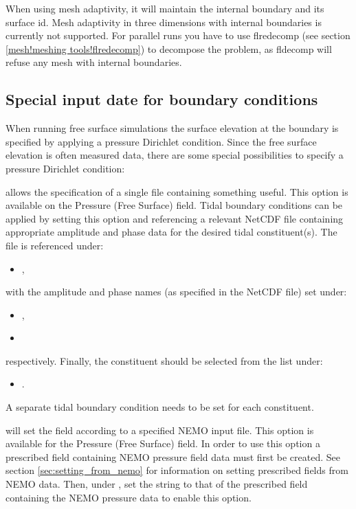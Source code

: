 When using mesh adaptivity, it will maintain the internal boundary and its
surface id. Mesh adaptivity in three dimensions with internal boundaries 
is currently not supported. For parallel runs you have to use flredecomp (see
section \ref{mesh!meshing tools!flredecomp}) to
decompose the problem, as fldecomp will refuse any mesh with internal boundaries.

\subsection{Special input date for boundary conditions}\label{sec:BCs:specialised}

When running free surface simulations the surface elevation at the boundary is specified by applying a pressure Dirichlet condition. Since the free surface elevation is often measured data, there are some special possibilities to specify a pressure Dirichlet condition: 

 allows the specification of a single file
containing something useful. This option is available on the Pressure (Free
Surface) field. Tidal boundary conditions can be applied by setting this option
and referencing a relevant NetCDF file containing appropriate amplitude and phase data for the desired
tidal constituent(s). The file is referenced under:
\begin{itemize}
\item {},
\end{itemize}
with the amplitude and phase names (as specified in the NetCDF file) set under:
\begin{itemize}
\item {},
\item {}
\end{itemize}
respectively. Finally, the constituent should be selected from the list under:
\begin{itemize}
\item {}.
\end{itemize}
A separate tidal boundary condition needs to be set for each constituent.

 will set the field according to a specified NEMO
input file. This option is available for the Pressure (Free Surface) field.
In order to use this option a prescribed field containing NEMO pressure
field data must first be created. See section \ref{sec:setting_from_nemo}
for information on setting prescribed fields from NEMO data. Then, under
, set the string to that of the prescribed
field containing the NEMO pressure data to enable this option.

